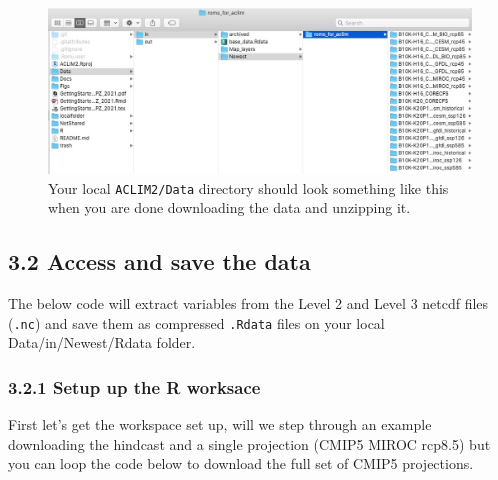 \documentclass[
]{article}
\newenvironment{Shaded}{\begin{snugshade}}{\end{snugshade}}
\newcommand{\CommentTok}[1]{\textcolor[rgb]{0.56,0.35,0.01}{\textit{#1}}}
\newcommand{\KeywordTok}[1]{\textcolor[rgb]{0.13,0.29,0.53}{\textbf{#1}}}
\newcommand{\NormalTok}[1]{#1}
\newcommand{\StringTok}[1]{\textcolor[rgb]{0.31,0.60,0.02}{#1}}
\begin{document}
\begin{figure}
\centering
\includegraphics[width=1\textwidth,height=\textheight]{Figs/data_dir.jpg}
\caption{Your local \texttt{ACLIM2/Data} directory should look something
like this when you are done downloading the data and unzipping it.}
\end{figure}

\hypertarget{access-and-save-the-data}{%
\subsection{3.2 Access and save the
data}\label{access-and-save-the-data}}

The below code will extract variables from the Level 2 and Level 3
netcdf files (\texttt{.nc}) and save them as compressed \texttt{.Rdata}
files on your local Data/in/Newest/Rdata folder.

\hypertarget{setup-up-the-r-worksace}{%
\subsubsection{3.2.1 Setup up the R
worksace}\label{setup-up-the-r-worksace}}

First let's get the workspace set up, will we step through an example
downloading the hindcast and a single projection (CMIP5 MIROC rcp8.5)
but you can loop the code below to download the full set of CMIP5
projections.

\begin{Shaded}
\end{Shaded}
\end{document}
